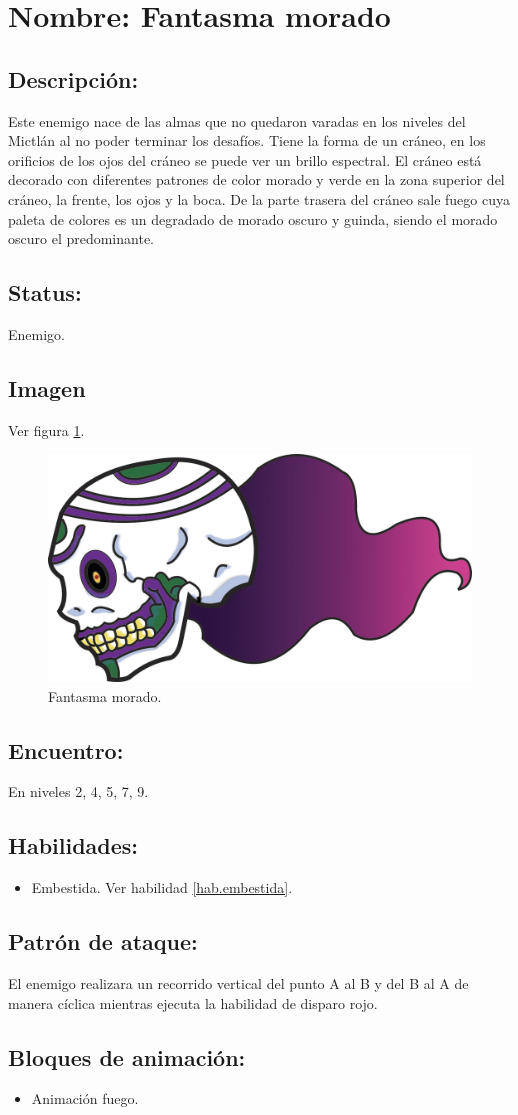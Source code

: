 \section{Nombre: Fantasma morado}   \label{per:fantasmaM}
\subsection{Descripción:}
Este enemigo nace de las almas que no quedaron varadas en los niveles del Mictlán al no poder terminar los desafíos. Tiene la forma de un cráneo, en los orificios de los ojos del cráneo se puede ver un brillo espectral. El cráneo está decorado con diferentes patrones de color morado y verde en la zona superior del cráneo, la frente, los ojos y la boca. De la parte trasera del cráneo sale fuego cuya paleta de colores es un degradado de morado oscuro y guinda, siendo el morado oscuro el predominante.  
\subsection{Status:}
Enemigo.
\subsection{Imagen}
Ver figura \ref{fig:fantasmaM}.
\begin{figure}
	\centering
	\includegraphics[height=0.2 \textheight]{Imagenes/fantasmaMorado}
	\caption{Fantasma morado.}
	\label{fig:fantasmaM}
\end{figure}
\subsection{Encuentro:}
En niveles 2, 4, 5, 7, 9.
\subsection{Habilidades:}
\begin{itemize}
	\item Embestida. Ver habilidad \ref{hab.embestida}.
	
\end{itemize}
\subsection{Patrón de ataque:}
El enemigo realizara un recorrido vertical del punto A al B y del B al A de manera cíclica mientras ejecuta la habilidad de disparo rojo.
\subsection{Bloques de animación:}
	\begin{itemize}
		\item Animación fuego.
	\end{itemize}